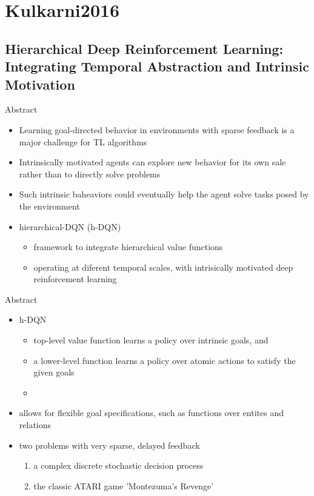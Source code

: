 
\section{Kulkarni2016}

\subsection{Hierarchical Deep Reinforcement Learning: Integrating Temporal Abstraction and Intrinsic Motivation}
\begin{frame}{Abstract}{}
  \begin{itemize}
    \item {Learning goal-directed behavior in environments with sparse feedback is a major challenge for TL algorithms}
    \item{Intrinsically motivated agents can explore new behavior for its own sale rather than to directly solve problems}
    \item{Such intrinsic baheaviors could eventually help the agent solve tasks posed by the environment}
    \item{hierarchical-DQN (h-DQN)}
    \begin{itemize}
        \item{framework to integrate hierarchical value functions}
        \item{operating at diferent temporal scales, with intrisically motivated deep reinforcement learning}
    \end{itemize}
  \end{itemize}
\end{frame}

\begin{frame}{Abstract}{}
  \begin{itemize}
    \item h-DQN
    \begin{itemize}
        \item top-level value function learns a policy over intrinsic goals, and
        \item a lower-level function learns a policy over atomic actions to satisfy the given goals
        \item 
    \end{itemize}
    \item allows for flexible goal specifications, such as functions over entites and relations
    \item two problems with very sparse, delayed feedback
    \begin{enumerate}
        \item a complex discrete stochastic decision process
        \item the classic ATARI game 'Montezuma's Revenge'
    \end{enumerate}
  \end{itemize}
\end{frame}

